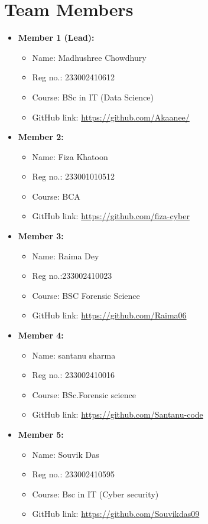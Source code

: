 \documentclass[a4paper,12pt]{report}
\begin{document}
\section*{Team Members}
\begin{itemize}
    \item \textbf{Member 1 (Lead):} 
    \begin{itemize}
        \item Name: Madhushree Chowdhury
        \item Reg no.: 233002410612
        \item Course: BSc in IT (Data Science)
        \item GitHub link: \url{https://github.com/Akaanee/}
    \end{itemize}

    \item \textbf{Member 2:} 
    \begin{itemize}
        \item Name: Fiza Khatoon 
        \item Reg no.: 233001010512
        \item Course: BCA
        \item GitHub link: \url{https://github.com/fiza-cyber}
    \end{itemize}

    \item \textbf{Member 3:} 
    \begin{itemize}
        \item Name: Raima Dey
        \item Reg no.:233002410023 
        \item Course: BSC Forensic Science
        \item GitHub link: \url{https://github.com/Raima06}
    \end{itemize}

    \item \textbf{Member 4:} 
    \begin{itemize}
        \item Name: santanu sharma
        \item Reg no.: 233002410016
        \item Course: BSc.Forensic science
        \item GitHub link: \url{https://github.com/Santanu-code}
    \end{itemize}

    \item \textbf{Member 5:} 
    \begin{itemize}
        \item Name: Souvik Das
        \item Reg no.: 233002410595
        \item Course: Bsc in IT (Cyber security) 
        \item GitHub link: \url{https://github.com/Souvikdas09}
    \end{itemize}
\end{itemize}
\end{document}
